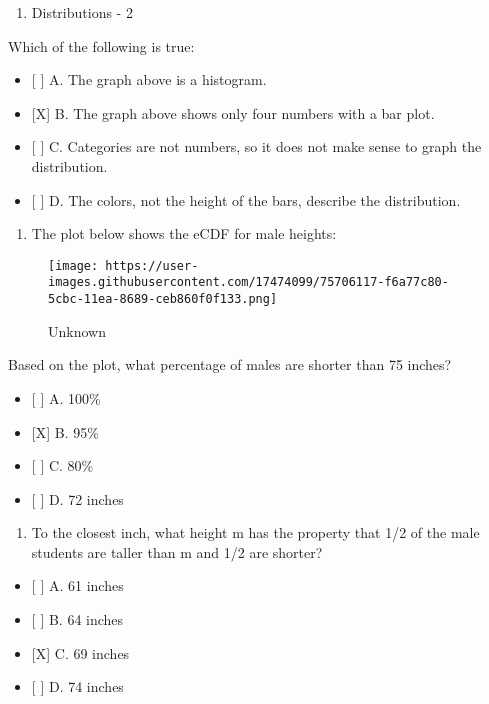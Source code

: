 \documentclass[]{article}
\providecommand{\tightlist}{%
  \setlength{\itemsep}{0pt}\setlength{\parskip}{0pt}}
\begin{document}
\begin{enumerate}
\def\labelenumi{\arabic{enumi}.}
\setcounter{enumi}{1}
\tightlist
\item
  Distributions - 2
\end{enumerate}

Which of the following is true:

\begin{itemize}
\tightlist
\item
  {[} {]} A. The graph above is a histogram.
\item
  {[}X{]} B. The graph above shows only four numbers with a bar plot.
\item
  {[} {]} C. Categories are not numbers, so it does not make sense to
  graph the distribution.
\item
  {[} {]} D. The colors, not the height of the bars, describe the
  distribution.
\end{itemize}

\begin{enumerate}
\def\labelenumi{\arabic{enumi}.}
\setcounter{enumi}{2}
\tightlist
\item
  The plot below shows the eCDF for male heights:
\end{enumerate}

\begin{figure}
\centering
\texttt{[image: https://user-images.githubusercontent.com/17474099/75706117-f6a77c80-5cbc-11ea-8689-ceb860f0f133.png]}
\caption{Unknown}
\end{figure}

Based on the plot, what percentage of males are shorter than 75 inches?

\begin{itemize}
\tightlist
\item
  {[} {]} A. 100\%
\item
  {[}X{]} B. 95\%
\item
  {[} {]} C. 80\%
\item
  {[} {]} D. 72 inches
\end{itemize}

\begin{enumerate}
\def\labelenumi{\arabic{enumi}.}
\setcounter{enumi}{3}
\tightlist
\item
  To the closest inch, what height m has the property that 1/2 of the
  male students are taller than m and 1/2 are shorter?
\end{enumerate}

\begin{itemize}
\tightlist
\item
  {[} {]} A. 61 inches
\item
  {[} {]} B. 64 inches
\item
  {[}X{]} C. 69 inches
\item
  {[} {]} D. 74 inches
\end{itemize}
\end{document}
